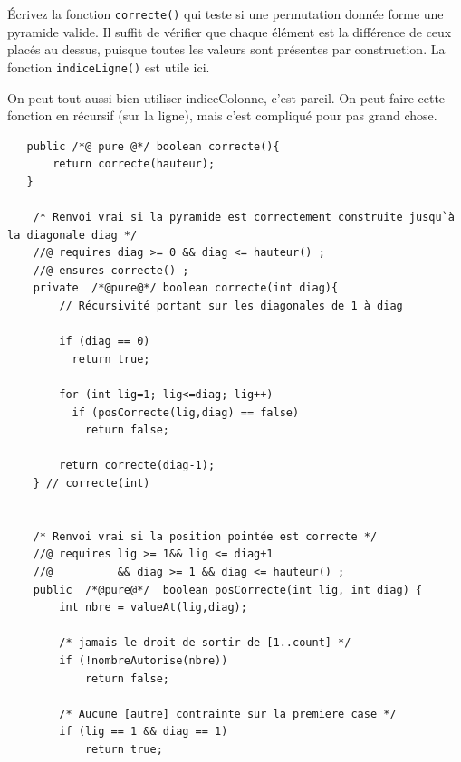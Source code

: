 \documentclass[10pt]{article}\usepackage[correction,nu]{esial}
\begin{document}
\begin{Question}
  Écrivez la fonction \texttt{correcte()} qui teste si une permutation donnée
  forme une pyramide valide. Il suffit de vérifier que chaque élément est la
  différence de ceux placés au dessus, puisque toutes les valeurs sont présentes
  par construction. La fonction \texttt{indiceLigne()} est utile ici.
\end{Question}
\begin{Reponse}
  On peut tout aussi bien utiliser indiceColonne, c'est pareil. On peut faire
  cette fonction en récursif (sur la ligne), mais c'est compliqué pour pas grand chose.

  \newcommand*\FancyVerbStopString{blablablabla}
  \newcommand*\FancyVerbStartString{// Fin génération, début du test}

  \noindent{}

	
\begin{verbatim}
   public /*@ pure @*/ boolean correcte(){
       return correcte(hauteur);
   } 

    /* Renvoi vrai si la pyramide est correctement construite jusqu`à la diagonale diag */
    //@ requires diag >= 0 && diag <= hauteur() ;
    //@ ensures correcte() ;
    private  /*@pure@*/ boolean correcte(int diag){
        // Récursivité portant sur les diagonales de 1 à diag

        if (diag == 0)
          return true;

        for (int lig=1; lig<=diag; lig++)
          if (posCorrecte(lig,diag) == false)
            return false;

        return correcte(diag-1);
    } // correcte(int)


    /* Renvoi vrai si la position pointée est correcte */
    //@ requires lig >= 1&& lig <= diag+1 
    //@          && diag >= 1 && diag <= hauteur() ;
    public  /*@pure@*/  boolean posCorrecte(int lig, int diag) {
        int nbre = valueAt(lig,diag);

        /* jamais le droit de sortir de [1..count] */
        if (!nombreAutorise(nbre)) 
            return false;

        /* Aucune [autre] contrainte sur la premiere case */
        if (lig == 1 && diag == 1)
            return true;


\end{verbatim}
\end{Reponse}
\end{document}
